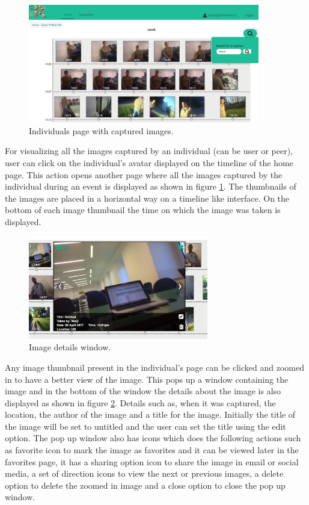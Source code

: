 \documentclass[mscthesis]{usiinfthesis}
\begin{document}
\begin{figure}[!ht]
  \centering
  \includegraphics[width=0.9\textwidth]{User}
  \caption{Individuals page with captured images.}
  \label{fig11}
\end{figure}

For visualizing all the images captured by an individual (can be user or peer), user can click on the individual's avatar displayed on the timeline of the home page. This action opens another page where all the images captured by the individual during an event is displayed as shown in figure \ref{fig11}. The thumbnails of the images are placed in a horizontal way on a timeline like interface. On the bottom of each image thumbnail the time on which the image was taken is displayed. 

\begin{figure}[!ht]
  \centering
  \includegraphics[width=0.7\textwidth]{Pop}
  \caption{Image details window.}
  \label{fig12}
\end{figure}

Any image thumbnail present in the individual's page can be clicked and zoomed in to have a better view of the image. This pops up a window containing the image and in the bottom of the window the details about the image is also displayed as shown in figure \ref{fig12}. Details such as, when it was captured, the location, the author of the image and a title for the image. Initially the title of the image will be set to untitled and the user can set the title using the edit option. The pop up window also has icons which does the following actions such as favorite icon to mark the image as favorites and it can be viewed later in the favorites page, it has a sharing option icon to share the image in email or social media, a set of direction icons to view the next or previous images, a delete option to delete the zoomed in image and a close option to close the pop up window. 
\end{document}

